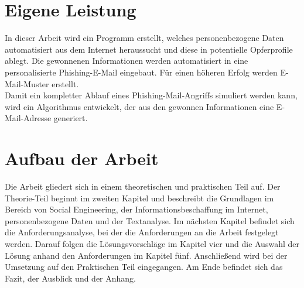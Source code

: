 

 	
\section{Eigene Leistung}
\label {sec:Eigene Leistung} 
In dieser Arbeit wird ein Programm erstellt, welches personenbezogene Daten automatisiert aus dem Internet heraussucht und diese in potentielle Opferprofile ablegt. Die gewonnenen Informationen werden  automatisiert in eine personalisierte Phishing-E-Mail eingebaut. Für einen höheren Erfolg werden E-Mail-Muster erstellt.\\
Damit ein kompletter Ablauf eines Phishing-Mail-Angriffs simuliert werden kann, wird ein Algorithmus entwickelt, der aus den gewonnen Informationen eine E-Mail-Adresse generiert.

\section{Aufbau der Arbeit}
\label {sec:Aufbau der Arbeit} 
Die Arbeit gliedert sich in einem theoretischen und praktischen Teil auf. Der Theorie-Teil beginnt im zweiten Kapitel und beschreibt die Grundlagen im Bereich von Social Engineering, der Informationsbeschaffung im Internet, personenbezogene Daten und der Textanalyse. Im nächsten Kapitel befindet sich die Anforderungsanalyse, bei der die Anforderungen an die Arbeit festgelegt werden. Darauf folgen die Lösungsvorschläge im Kapitel vier und die Auswahl der Lösung anhand den Anforderungen im Kapitel fünf. Anschließend wird bei der Umsetzung auf den Praktischen Teil eingegangen. Am Ende befindet sich das Fazit, der Ausblick und der Anhang.






